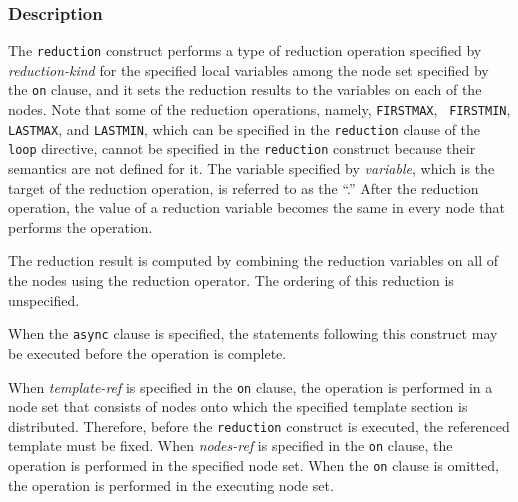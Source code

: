 \subsubsection*{Description}

The {\tt reduction} construct performs a type of
reduction operation specified by {\it reduction-kind} for the specified
local variables among the node set specified by the {\tt on}
clause, and it sets the reduction results to the variables on each of the
nodes.
%
Note that some of the reduction operations, namely, {\tt FIRSTMAX}, {\tt
FIRSTMIN}, {\tt LASTMAX}, and {\tt LASTMIN}, which can be specified in
the {\tt reduction} clause of the {\tt loop} directive, cannot be
specified in the {\tt reduction} construct because their semantics are
not defined for it.
%
The variable specified by {\it variable}, which is the target of the
reduction operation, is referred to as the ``.'' After the reduction operation, the value of a reduction
variable becomes the same in every node that performs the operation.

The reduction result is computed by combining the reduction variables on
all of the nodes using the reduction operator. The ordering of this
reduction is unspecified.

When the {\tt async} clause is specified, the statements following this
construct may be executed before the operation is complete.

When {\it template-ref} is specified in the {\tt on} clause, the operation
is performed in a node set that consists of nodes onto which the
specified template section is distributed.
Therefore, before the {\tt reduction} construct is executed, the
referenced template must be fixed.
%
%
%
When {\it nodes-ref} is specified in the {\tt on} clause, the operation
is performed in the specified node set.
%
When the {\tt on} clause is omitted, the operation is performed in the
executing node set.

